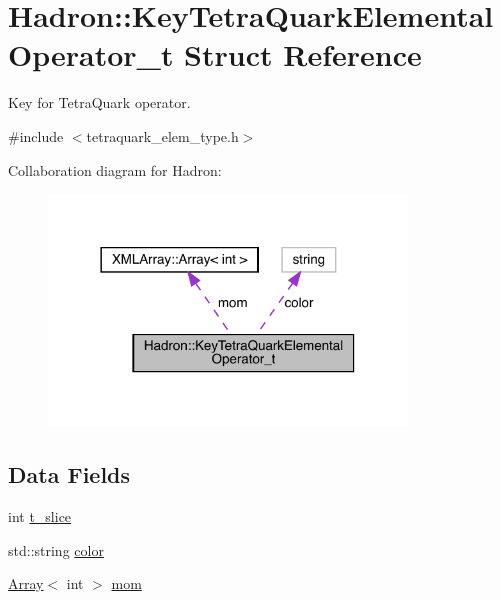 \hypertarget{structHadron_1_1KeyTetraQuarkElementalOperator__t}{}\section{Hadron\+:\+:Key\+Tetra\+Quark\+Elemental\+Operator\+\_\+t Struct Reference}
\label{structHadron_1_1KeyTetraQuarkElementalOperator__t}


Key for Tetra\+Quark operator.  




{\ttfamily \#include $<$tetraquark\+\_\+elem\+\_\+type.\+h$>$}



Collaboration diagram for Hadron\+:\nopagebreak
\begin{figure}[H]
\begin{center}
\leavevmode
\includegraphics[width=270pt]{d8/d73/structHadron_1_1KeyTetraQuarkElementalOperator__t__coll__graph}
\end{center}
\end{figure}
\subsection*{Data Fields}
\begin{DoxyCompactItemize}
\item 
int \mbox{\hyperlink{structHadron_1_1KeyTetraQuarkElementalOperator__t_a3375660f000fa53b1c942e36e8f43cb8}{t\+\_\+slice}}
\item 
std\+::string \mbox{\hyperlink{structHadron_1_1KeyTetraQuarkElementalOperator__t_aeb7ad2a91c69b04ed9b3b37d20be1ffe}{color}}
\item 
\mbox{\hyperlink{classXMLArray_1_1Array}{Array}}$<$ int $>$ \mbox{\hyperlink{structHadron_1_1KeyTetraQuarkElementalOperator__t_a722fb3cb3ff844a07f67d0fc0d5e507d}{mom}}
\end{DoxyCompactItemize}


